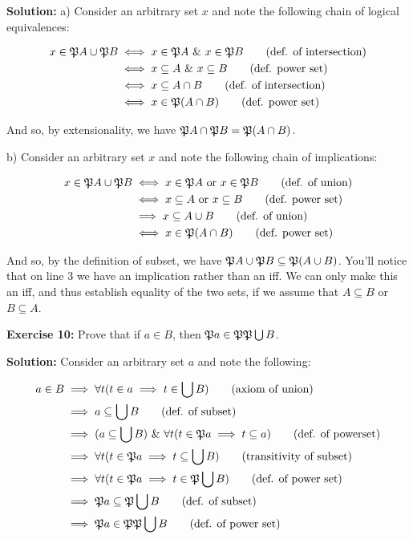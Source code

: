 \documentclass{article}
\begin{document}
\noindent\textbf{Solution:} a) Consider an arbitrary set $x$ and note the following chain of logical equivalences:

\begin{align*}
    x\in\mathfrak PA\cup\mathfrak PB&\iff x\in \mathfrak PA \,\,\&\,\, x\in\mathfrak PB\tag{def. of intersection}\\
    &\iff x\subseteq A\,\,\&\,\, x\subseteq B\tag{def. power set}\\
    &\iff x\subseteq A\cap B\tag{def. of intersection}\\
    &\iff x\in\mathfrak P(A\cap B)\tag{def. power set}
\end{align*}



And so, by extensionality, we have $\mathfrak PA\cap\mathfrak PB=\mathfrak P(A\cap B)$.

b) Consider an arbitrary set $x$ and note the following chain of implications:

\begin{align*}
    x\in\mathfrak PA\cup\mathfrak PB&\iff x\in \mathfrak PA \text{ or } x\in\mathfrak PB\tag{def. of union}\\
    &\iff x\subseteq A\text{ or } x\subseteq B\tag{def. power set}\\
    &\implies x\subseteq A\cup B\tag{def. of union}\\
    &\iff x\in\mathfrak P(A\cap B)\tag{def. power set}
\end{align*}

And so, by the definition of subset, we have $\mathfrak PA\cup\mathfrak PB\subseteq\mathfrak P(A\cup B)$. You'll notice that on line 3 we have an implication rather than an iff. We can only make this an iff, and thus establish equality of the two sets, if we assume that $A\subseteq B$ or $B\subseteq A$.
\bigskip

\noindent\textbf{Exercise 10:} Prove that if $a\in B$, then $\mathfrak Pa\in \mathfrak P\mathfrak P\bigcup B$.
\bigskip

\noindent\textbf{Solution:} Consider an arbitrary set $a$ and note the following:

\begin{align*}
    a\in B&\implies\forall t(t\in a\implies t\in\bigcup B)\tag{axiom of union}\\
    &\implies a\subseteq\bigcup B\tag{def. of subset}\\
    &\implies(a\subseteq\bigcup B)\,\,\&\,\,\forall t(t\in\mathfrak Pa\implies t\subseteq a)\tag{def. of powerset}\\
    &\implies\forall t(t\in\mathfrak Pa\implies t\subseteq\bigcup B)\tag{transitivity of subset}\\
    &\implies\forall t(t\in\mathfrak Pa\implies t\in\mathfrak P\bigcup B)\tag{def. of power set}\\
    &\implies \mathfrak Pa\subseteq \mathfrak P\bigcup B\tag{def. of subset}\\
    &\implies \mathfrak Pa\in \mathfrak P\mathfrak P\bigcup B\tag{def. of power set}\\
\end{align*}
\end{document}
